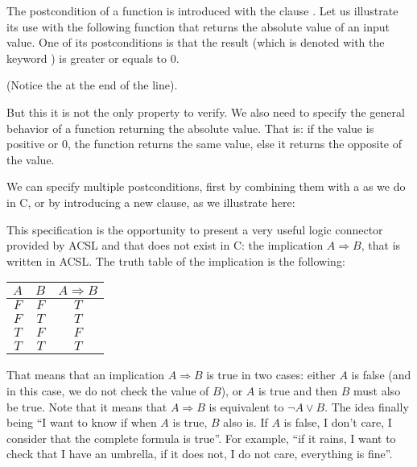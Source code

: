 The postcondition of a function is introduced with the clause . 
Let us illustrate its use with the following function
that returns the absolute value of an input value. One of its postconditions
is that the result (which is denoted with the keyword
) is greater or equals to 0.






(Notice the \CodeInline{;} at the end of the line).

But this it is not the only property to verify. We also need to specify
the general behavior of a function returning the absolute value. That
is: if the value is positive or 0, the function returns the same value,
else it returns the opposite of the value.

We can specify multiple postconditions, first by combining them with a
\CodeInline{\&\&} as we do in C, or by introducing a new 
clause, as we illustrate here:







This specification is the opportunity to present a very useful logic
connector provided by ACSL and that does not exist in C: the implication
$A \Rightarrow B$, that is written  in
ACSL. The truth table of the implication is the following:



\begin{longtabu}{|c|c|c|} \hline
$A$ & $B$ & $A \Rightarrow B$ \\ \hline
$F$ & $F$ & $T$ \\ \hline
$F$ & $T$ & $T$ \\ \hline
$T$ & $F$ & $F$ \\ \hline
$T$ & $T$ & $T$ \\ \hline
\end{longtabu}



That means that an implication $A \Rightarrow B$ is true in two cases:
either $A$ is false (and in this case, we do not check the value of
$B$), or $A$ is true and then $B$ must also be true. Note that it means
that $A \Rightarrow B$ is equivalent to $\neg A \vee B$. The idea
finally being ``I want to know if when $A$ is true, $B$ also is. If
$A$ is false, I don't care, I consider that the complete formula is
true''. For example, ``if it rains, I want to check that I have an
umbrella, if it does not, I do not care, everything is fine''.



